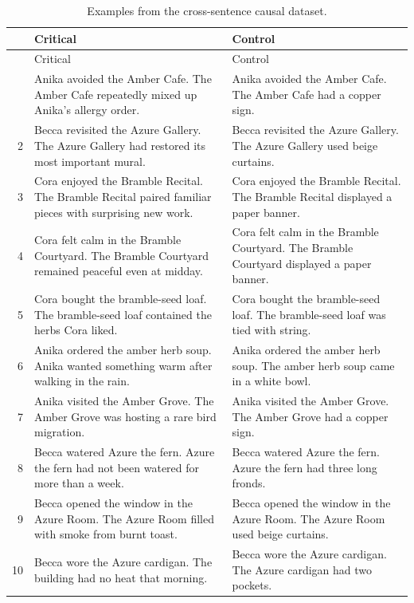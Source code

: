 \begingroup
\setlength{\tabcolsep}{4pt}
\renewcommand{\arraystretch}{1.08}
\begin{longtable}{@{}>{\footnotesize}r >{\footnotesize\raggedright\arraybackslash}p{.44\linewidth} >{\footnotesize\raggedright\arraybackslash}p{.44\linewidth}@{}}
\caption{Examples from the cross-sentence causal dataset.}
\label{tab:cross-sentence-examples}\\
\toprule
& Critical & Control \\
\midrule
\endfirsthead
\toprule
& Critical & Control \\
\midrule
\endhead
\bottomrule
\endfoot
1 & Anika avoided the Amber Cafe. The Amber Cafe repeatedly mixed up Anika's allergy order. & Anika avoided the Amber Cafe. The Amber Cafe had a copper sign. \\
2 & Becca revisited the Azure Gallery. The Azure Gallery had restored its most important mural. & Becca revisited the Azure Gallery. The Azure Gallery used beige curtains. \\
3 & Cora enjoyed the Bramble Recital. The Bramble Recital paired familiar pieces with surprising new work. & Cora enjoyed the Bramble Recital. The Bramble Recital displayed a paper banner. \\
4 & Cora felt calm in the Bramble Courtyard. The Bramble Courtyard remained peaceful even at midday. & Cora felt calm in the Bramble Courtyard. The Bramble Courtyard displayed a paper banner. \\
5 & Cora bought the bramble-seed loaf. The bramble-seed loaf contained the herbs Cora liked. & Cora bought the bramble-seed loaf. The bramble-seed loaf was tied with string. \\
6 & Anika ordered the amber herb soup. Anika wanted something warm after walking in the rain. & Anika ordered the amber herb soup. The amber herb soup came in a white bowl. \\
7 & Anika visited the Amber Grove. The Amber Grove was hosting a rare bird migration. & Anika visited the Amber Grove. The Amber Grove had a copper sign. \\
8 & Becca watered Azure the fern. Azure the fern had not been watered for more than a week. & Becca watered Azure the fern. Azure the fern had three long fronds. \\
9 & Becca opened the window in the Azure Room. The Azure Room filled with smoke from burnt toast. & Becca opened the window in the Azure Room. The Azure Room used beige curtains. \\
10 & Becca wore the Azure cardigan. The building had no heat that morning. & Becca wore the Azure cardigan. The Azure cardigan had two pockets. \\
\end{longtable}
\endgroup

